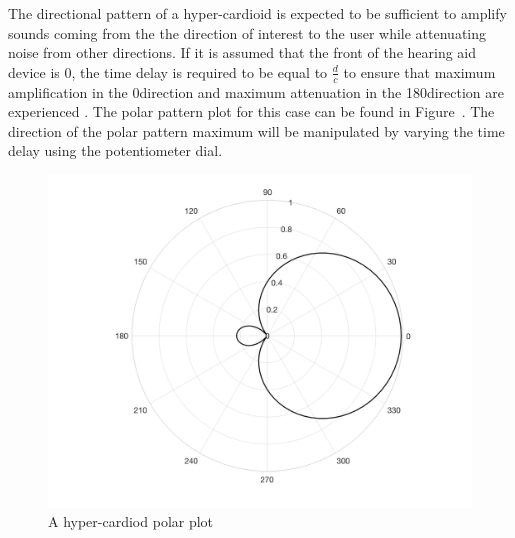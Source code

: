 \documentclass[10pt,twocolumn]{witseiepaper}
\begin{document}
The directional pattern of a hyper-cardioid is expected to be sufficient to amplify sounds coming from the the direction of interest to the user while attenuating noise from other directions. If it is assumed that the front of the hearing aid device is 0\textdegree, the time delay is required to be equal to $\frac{d}{c}$ to ensure that maximum amplification in the 0\textdegree direction and maximum attenuation in the 180\textdegree direction are experienced \cite{Distortion_of_interaural_time_cues}. The polar pattern plot for this case can be found in Figure~. The direction of the polar pattern maximum will be manipulated by varying the time delay using the potentiometer dial. 

\begin{figure}[h]
	\centering
	\includegraphics[width=0.9\columnwidth]{polarPlot.png}
	\caption{A hyper-cardiod polar plot}
	\raggedright
	\label{fig:polar}	
\end{figure}
\end{document}
